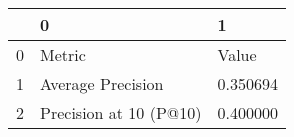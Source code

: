 \begin{tabular}{lll}
\toprule
 & 0 & 1 \\
\midrule
0 & Metric & Value \\
1 & Average Precision & 0.350694 \\
2 & Precision at 10 (P@10) & 0.400000 \\
\bottomrule
\end{tabular}
